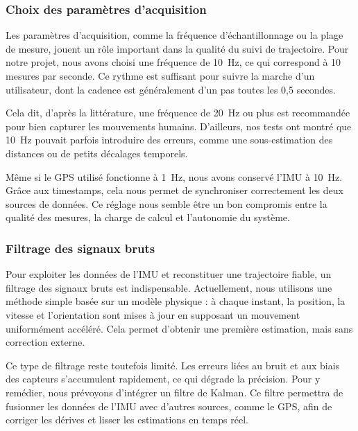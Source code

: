 \vspace{2em}

\subsubsection{Choix des paramètres d’acquisition}

Les paramètres d’acquisition, comme la fréquence d’échantillonnage ou la plage de mesure, jouent un rôle important dans la qualité du suivi de trajectoire. Pour notre projet, nous avons choisi une fréquence de 10~Hz, ce qui correspond à 10 mesures par seconde. Ce rythme est suffisant pour suivre la marche d’un utilisateur, dont la cadence est généralement d’un pas toutes les 0{,}5 secondes.

\vspace{1em}

Cela dit, d’après la littérature, une fréquence de 20~Hz ou plus est recommandée pour bien capturer les mouvements humains. D’ailleurs, nos tests ont montré que 10~Hz pouvait parfois introduire des erreurs, comme une sous-estimation des distances ou de petits décalages temporels.

\vspace{1em}

Même si le GPS utilisé fonctionne à 1~Hz, nous avons conservé l’IMU à 10~Hz. Grâce aux timestamps, cela nous permet de synchroniser correctement les deux sources de données. Ce réglage nous semble être un bon compromis entre la qualité des mesures, la charge de calcul et l’autonomie du système.

\vspace{2em}

\subsubsection{Filtrage des signaux bruts}

Pour exploiter les données de l’IMU et reconstituer une trajectoire fiable, un filtrage des signaux bruts est indispensable. Actuellement, nous utilisons une méthode simple basée sur un modèle physique : à chaque instant, la position, la vitesse et l’orientation sont mises à jour en supposant un mouvement uniformément accéléré. Cela permet d’obtenir une première estimation, mais sans correction externe.

\vspace{1em}

Ce type de filtrage reste toutefois limité. Les erreurs liées au bruit et aux biais des capteurs s’accumulent rapidement, ce qui dégrade la précision. Pour y remédier, nous prévoyons d’intégrer un filtre de Kalman. Ce filtre permettra de fusionner les données de l’IMU avec d’autres sources, comme le GPS, afin de corriger les dérives et lisser les estimations en temps réel.

